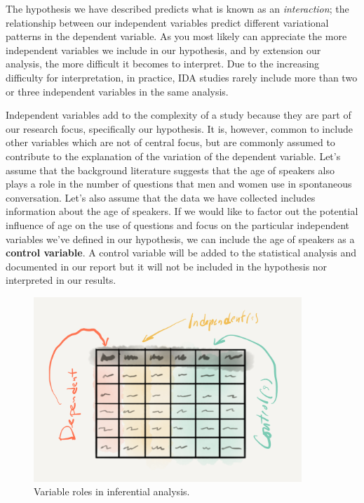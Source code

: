 \documentclass[
  letterpaper,
]{latex/krantz}
\begin{document}
The hypothesis we have described predicts what is known as an
\emph{interaction}; the relationship between our independent variables
predict different variational patterns in the dependent variable. As you
most likely can appreciate the more independent variables we include in
our hypothesis, and by extension our analysis, the more difficult it
becomes to interpret. Due to the increasing difficulty for
interpretation, in practice, IDA studies rarely include more than two or
three independent variables in the same analysis.

Independent variables add to the complexity of a study because they are
part of our research focus, specifically our hypothesis. It is, however,
common to include other variables which are not of central focus, but
are commonly assumed to contribute to the explanation of the variation
of the dependent variable. Let's assume that the background literature
suggests that the age of speakers also plays a role in the number of
questions that men and women use in spontaneous conversation. Let's also
assume that the data we have collected includes information about the
age of speakers. If we would like to factor out the potential influence
of age on the use of questions and focus on the particular independent
variables we've defined in our hypothesis, we can include the age of
speakers as a \textbf{control variable}. A control variable will be
added to the statistical analysis and documented in our report but it
will not be included in the hypothesis nor interpreted in our results.

\begin{figure}[h]

{\centering \includegraphics[width=0.9\textwidth,height=\textheight]{./figures/approaching-analysis/inferential-variables.png}

}

\caption{\label{fig-aa-inferential-variables}Variable roles in
inferential analysis.}

\end{figure}
\end{document}
